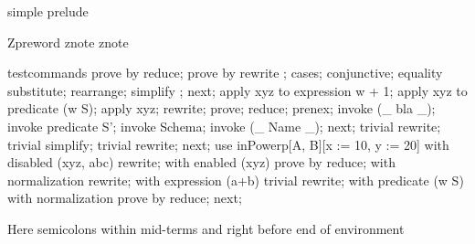 \begin{zsection}
   \SECTION simple \parents prelude
\end{zsection}

Zpreword znote znote  %

\begin{zproof}{testcommands}
prove     by
                  reduce;
prove by rewrite ; %
cases;
  conjunctive;
  equality substitute;
  rearrange;
  simplify ;
next;
  apply xyz to expression w + 1;
  apply xyz to predicate (w \in S);
  apply xyz; %
  rewrite;
  prove;
  reduce;
  prenex;
  invoke (\_ bla \_);
  invoke predicate S';
  invoke Schema;
  invoke (\_ Name \_);
next;
  trivial rewrite;
  trivial simplify;
  trivial rewrite;
next;
  use inPowerp[A, B][x := 10, y := 20]
  with disabled (xyz, abc) rewrite;
  with enabled (xyz) prove by reduce;
  with normalization rewrite;
  with expression (a+b) trivial rewrite;
  with predicate (w \in S)
    with normalization prove by reduce;
next;
\end{zproof}

Here semicolons within mid-terms and right before end of environment
